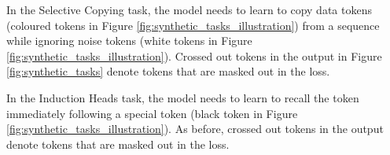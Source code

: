 \documentclass[11pt, a4paper, logo, onecolumn]{googledeepmind}
\theoremstyle{definition}
\begin{document}
In the Selective Copying task, the model needs to learn to copy data tokens (coloured tokens in Figure \ref{fig:synthetic_tasks_illustration}) from a sequence while ignoring noise tokens (white tokens in Figure \ref{fig:synthetic_tasks_illustration}). Crossed out tokens in the output in Figure \ref{fig:synthetic_tasks} denote tokens that are masked out in the loss.

In the Induction Heads task, the model needs to learn to recall the token immediately following a special token (black token in Figure \ref{fig:synthetic_tasks_illustration}). As before, crossed out tokens in the output denote tokens that are masked out in the loss.
\end{document}
